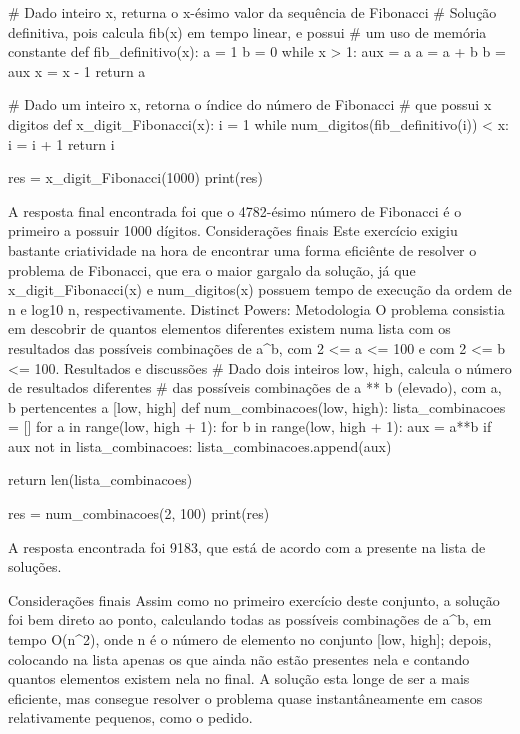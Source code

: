             # Dado inteiro x, returna o x-ésimo valor da sequência de Fibonacci
            # Solução definitiva, pois calcula fib(x) em tempo linear, e possui 
            # um uso de memória constante
            def fib_definitivo(x):
                a = 1
                b = 0
                while x > 1:
                    aux = a
                    a = a + b
                    b = aux
                    x = x - 1
                return a

            # Dado um inteiro x, retorna o índice do número de Fibonacci 
            # que possui x digitos
            def x_digit_Fibonacci(x):
                i = 1
                while num_digitos(fib_definitivo(i)) < x:
                    i = i + 1
                return i

            res = x_digit_Fibonacci(1000)
            print(res)

            A resposta final encontrada foi que o 4782-ésimo número de Fibonacci é o primeiro a possuir 1000 dígitos.
        Considerações finais
            Este exercício exigiu bastante criatividade na hora de encontrar uma forma eficiênte de resolver o problema de Fibonacci, que era o maior gargalo da solução, já que x_digit_Fibonacci(x) e num_digitos(x) possuem tempo de execução da ordem de n e log10 n, respectivamente. 
    Distinct Powers:
        Metodologia
            O problema consistia em descobrir de quantos elementos diferentes existem numa lista com os resultados das possíveis combinações de a^b, com 2 <= a <= 100 e com 2 <= b <= 100.
        Resultados e discussões
            # Dado dois inteiros low, high, calcula o número de resultados diferentes 
            # das possíveis combinações de a ** b (elevado), com a, b pertencentes a [low, high]
            def num_combinacoes(low, high):
                lista_combinacoes = []
                for a in range(low, high + 1):
                    for b in range(low, high + 1):
                        aux = a**b
                        if aux not in lista_combinacoes:
                            lista_combinacoes.append(aux)
                
                return len(lista_combinacoes)

            res = num_combinacoes(2, 100)
            print(res)

            A resposta encontrada foi 9183, que está de acordo com a presente na lista de soluções.

        Considerações finais
            Assim como no primeiro exercício deste conjunto, a solução foi bem direto ao ponto, calculando todas as possíveis combinações de a^b, em tempo O(n^2), onde n é o número de elemento no conjunto [low, high]; depois, colocando na lista apenas os que ainda não estão presentes nela e contando quantos elementos existem nela no final. A solução esta longe de ser a mais eficiente, mas consegue resolver o problema quase instantâneamente em casos relativamente pequenos, como o pedido.

